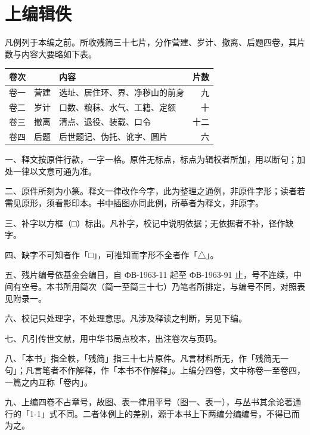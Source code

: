 \chapter*{上编\quad 辑佚}

凡例列于本编之前。所收残简三十七片，分作营建、岁计、撤离、后题四卷，其片数与内容大要略如下表。

\begin{center}
\small
\begin{tabular}{@{}llr@{}}
\toprule
卷次 & 内容 & 片数\\
\midrule
卷一　营建 & 选址、居住环、界、净秽山的前身 & 九\\
卷二　岁计 & 口数、粮秣、水气、工籍、定额 & 十\\
卷三　撤离 & 清点、退役、装载、口令 & 十二\\
卷四　后题 & 后世题记、伪托、讹字、圆片 & 六\\
\bottomrule
\end{tabular}
\end{center}

\vspace{4mm}

一、释文按原件行款，一字一格。原件无标点，标点为辑校者所加，用以断句；加处一律以文意可通为准。

二、原件所刻为小篆。释文一律改作今字，此为整理之通例，非原件字形；读者若需见原形，须看影印本。书中插图亦同此例，所摹者为释文，非原字。

三、补字以方框（□）标出。凡补字，校记中说明依据；无依据者不补，径作缺字。

四、缺字不可知者作「□」，可推知而字形不全者作「△」。

五、残片编号依基金会编目，自 ФВ-1963-11 起至 ФВ-1963-91 止，号不连续，中间有空号。本书所用简次（简一至简三十七）乃笔者所排定，与编号不同，对照表见附录一。

六、校记只处理字，不处理意思。凡涉及释读之判断，另见下编。

七、凡引传世文献，用中华书局点校本，出注卷次与页码。

八、「本书」指全帙，「残简」指三十七片原件。凡言材料所无，作「残简无一句」；凡言笔者不作解释，作「本书不作解释」。上编分四卷，文中称卷一至卷四，一篇之内互称「卷内」。

九、上编四卷不占章号，故图、表一律用平号（图一、表一），与丛书其余论著通行的「1-1」式不同。二者体例上的差别，源于本书上下两编分编编号，不得已而为之。


